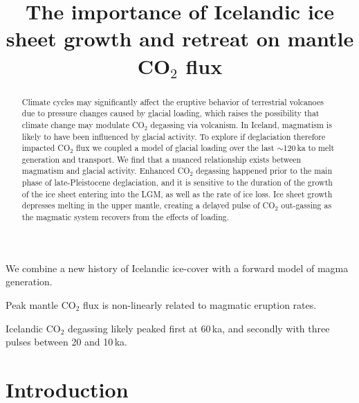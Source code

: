 \documentclass[draft,linenumbers]{agujournal2018}
\begin{document}
\title{The importance of Icelandic ice sheet growth and retreat on mantle CO$_2$ flux}





\begin{keypoints}
\item We combine a new history of Icelandic ice-cover with a forward model of magma generation.
\item Peak mantle CO$_{2}$ flux is non-linearly related to magmatic eruption rates.
\item Icelandic CO$_{2}$ degassing likely peaked first at 60\,ka, and secondly with three pulses between 20 and 10\,ka. 
\end{keypoints}

\begin{abstract}
Climate cycles may significantly affect the eruptive behavior of terrestrial volcanoes due to pressure changes caused by glacial loading, which raises the possibility that climate change may modulate CO$_{2}$ degassing via volcanism. In Iceland, magmatism is likely to have been influenced by glacial activity. To explore if deglaciation therefore impacted CO$_{2}$ flux we coupled a model of glacial loading over the last $\sim$120\,ka to melt generation and transport. We find that a nuanced relationship exists between magmatism and glacial activity. Enhanced CO$_{2}$ degassing happened prior to the main phase of late-Pleistocene deglaciation, and it is sensitive to the duration of the growth of the ice sheet entering into the LGM, as well as the rate of ice loss. Ice sheet growth depresses melting in the upper mantle, creating a delayed pulse of CO$_{2}$ out-gassing as the magmatic system recovers from the effects of loading.
\end{abstract}

\section{Introduction}
\end{document}
